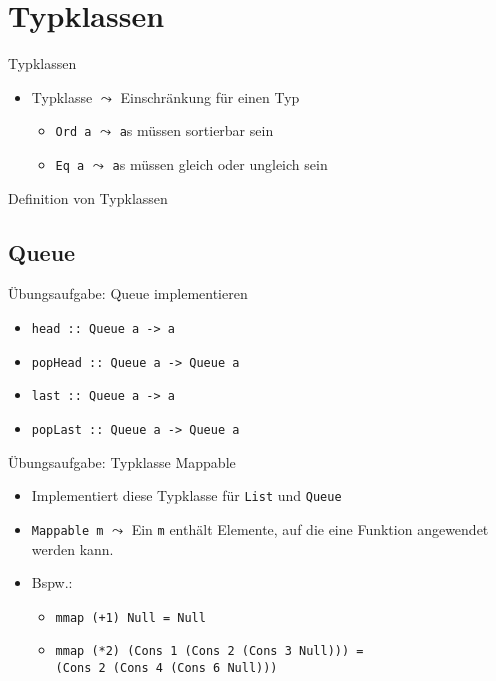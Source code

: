 \documentclass{beamer}
\newcommand{\code}[1]{
	\begin{mdframed}
		
	\end{mdframed}
}
\begin{document}
\section{Typklassen}

\begin{frame}{Typklassen}
	\code{demos/Classes.hs}

	\begin{itemize}
		\item Typklasse $\leadsto$ Einschränkung für einen Typ
		\begin{itemize}
			\item \texttt{Ord a} $\leadsto$ \texttt{a}s müssen sortierbar sein
			\item \texttt{Eq a} $\leadsto$ \texttt{a}s müssen gleich oder ungleich sein
		\end{itemize}
	\end{itemize}
\end{frame}

\begin{frame}{Definition von Typklassen}
	\code{demos/MyEq.hs}
\end{frame}

\subsection{Queue}

\begin{frame}{Übungsaufgabe: Queue implementieren}
	\code{demos/Queue.hs}

	\begin{itemize}
		\item \texttt{head :: Queue a -> a}
		\item \texttt{popHead :: Queue a -> Queue a}
		\item \texttt{last :: Queue a -> a}
		\item \texttt{popLast :: Queue a -> Queue a}
	\end{itemize}
\end{frame}

\begin{frame}{Übungsaufgabe: Typklasse Mappable}
  \code{demos/Mappable.hs}

  \begin{itemize}
    \item Implementiert diese Typklasse für \texttt{List} und \texttt{Queue}
    \item \texttt{Mappable m} $\leadsto$ Ein \texttt{m} enthält Elemente, auf die eine Funktion angewendet werden kann.
    \item Bspw.:
    \begin{itemize}
      \item \texttt{mmap (+1) Null = Null}
      \item \texttt{mmap (*2) (Cons 1 (Cons 2 (Cons 3 Null))) =\\
        (Cons 2 (Cons 4 (Cons 6 Null)))}
    \end{itemize}
  \end{itemize}
\end{frame}
\end{document}
